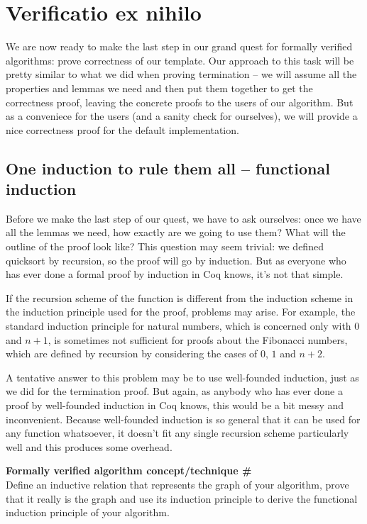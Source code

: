 \documentclass[declaration,mgr,english,shortabstract]{iithesis}
\newcounter{cnt}
\newcommand{\runcnt}{\#\arabic{cnt}}
\newcommand{\concept}[1]
{
    \refstepcounter{cnt}
    \begin{center}
        \textbf{Formally verified algorithm concept/technique \runcnt} \\
        #1
    \end{center}
}
\begin{document}
\chapter{Verificatio ex nihilo} \label{exnihilo}

We are now ready to make the last step in our grand quest for formally verified algorithms: prove correctness of our template. Our approach to this task will be pretty similar to what we did when proving termination -- we will assume all the properties and lemmas we need and then put them together to get the correctness proof, leaving the concrete proofs  to the users of our algorithm. But as a conveniece for the users (and a sanity check for ourselves), we will provide a nice correctness proof for the default implementation.

\section{One induction to rule them all -- functional induction} \label{funind}

Before we make the last step of our quest, we have to ask ourselves: once we have all the lemmas we need, how exactly are we going to use them? What will the outline of the proof look like? This question may seem trivial: we defined quicksort by recursion, so the proof will go by induction. But as everyone who has ever done a formal proof by induction in Coq knows, it's not that simple.

If the recursion scheme of the function is different from the induction scheme in the induction principle used for the proof, problems may arise. For example, the standard induction principle for natural numbers, which is concerned only with $0$ and $n + 1$, is sometimes not sufficient for proofs about the Fibonacci numbers, which are defined by recursion by considering the cases of $0$, $1$ and $n + 2$.

A tentative answer to this problem may be to use well-founded induction, just as we did for the termination proof. But again, as anybody who has ever done a proof by well-founded induction in Coq knows, this would be a bit messy and inconvenient. Because well-founded induction is so general that it can be used for any function whatsoever, it doesn't fit any single recursion scheme particularly well and this produces some overhead.

\concept{Define an inductive relation that represents the graph of your algorithm, prove that it really is the graph and use its induction principle to derive the functional induction principle of your algorithm.}
\end{document}

